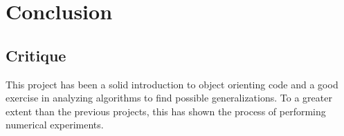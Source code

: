 \section{Conclusion}

\subsection{Critique}
This project has been a solid introduction to object orienting code and a good exercise in
analyzing algorithms to find possible generalizations. To a greater extent than the previous
projects, this has shown the process of performing numerical experiments.
